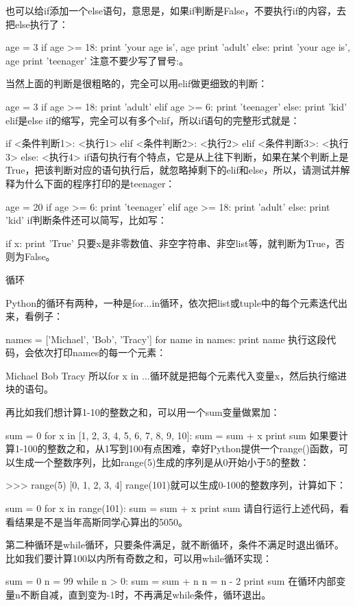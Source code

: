 也可以给if添加一个else语句，意思是，如果if判断是False，不要执行if的内容，去把else执行了：

age = 3
if age >= 18:
    print 'your age is', age
    print 'adult'
else:
    print 'your age is', age
    print 'teenager'
注意不要少写了冒号:。

当然上面的判断是很粗略的，完全可以用elif做更细致的判断：

age = 3
if age >= 18:
    print 'adult'
elif age >= 6:
    print 'teenager'
else:
    print 'kid'
elif是else if的缩写，完全可以有多个elif，所以if语句的完整形式就是：

if <条件判断1>:
    <执行1>
elif <条件判断2>:
    <执行2>
elif <条件判断3>:
    <执行3>
else:
    <执行4>
if语句执行有个特点，它是从上往下判断，如果在某个判断上是True，把该判断对应的语句执行后，就忽略掉剩下的elif和else，所以，请测试并解释为什么下面的程序打印的是teenager：

age = 20
if age >= 6:
    print 'teenager'
elif age >= 18:
    print 'adult'
else:
    print 'kid'
if判断条件还可以简写，比如写：

if x:
    print 'True'
只要x是非零数值、非空字符串、非空list等，就判断为True，否则为False。

循环

Python的循环有两种，一种是for...in循环，依次把list或tuple中的每个元素迭代出来，看例子：

names = ['Michael', 'Bob', 'Tracy']
for name in names:
    print name
执行这段代码，会依次打印names的每一个元素：

Michael
Bob
Tracy
所以for x in ...循环就是把每个元素代入变量x，然后执行缩进块的语句。

再比如我们想计算1-10的整数之和，可以用一个sum变量做累加：

sum = 0
for x in [1, 2, 3, 4, 5, 6, 7, 8, 9, 10]:
    sum = sum + x
print sum
如果要计算1-100的整数之和，从1写到100有点困难，幸好Python提供一个range()函数，可以生成一个整数序列，比如range(5)生成的序列是从0开始小于5的整数：

>>> range(5)
[0, 1, 2, 3, 4]
range(101)就可以生成0-100的整数序列，计算如下：

sum = 0
for x in range(101):
    sum = sum + x
print sum
请自行运行上述代码，看看结果是不是当年高斯同学心算出的5050。

第二种循环是while循环，只要条件满足，就不断循环，条件不满足时退出循环。比如我们要计算100以内所有奇数之和，可以用while循环实现：

sum = 0
n = 99
while n > 0:
    sum = sum + n
    n = n - 2
print sum
在循环内部变量n不断自减，直到变为-1时，不再满足while条件，循环退出。

